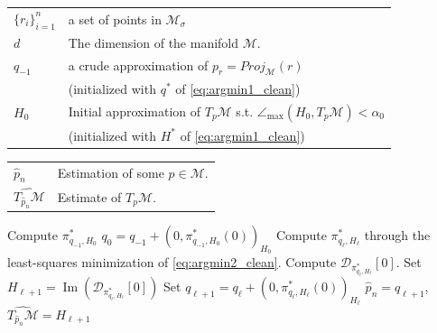 \documentclass[12pt]{article}
\theoremstyle{remark}
\newcommand{\MM}{\mathcal{M}}
\newcommand{\DD}{\mathcal{D}}
\DeclareMathOperator{\Ima}{Im}
\newcommand{\mycomment}[1]{
	\textcolor{red}{Comment: #1}%
}
\begin{document}
\begin{algorithm}[H]
	\caption{Step 2: in practice}
	\label{alg:step2InPractice_clean}
	\begin{algorithmic}[1]
		\begin{tabular}[t]{ll}
            $\{r_i\}_{i=1}^n$& a set of points in $\MM_\sigma$ \\
            $d$ & The dimension of the manifold $\MM$.\\
            $q_{-1}$ & a crude approximation of $p_r = Proj_\MM(r)$ \\ &(initialized with $q^*$ of \eqref{eq:argmin1_clean})\\
			$H_0$ & Initial approximation of $T_{p}\MM$ s.t. $\angle_{\max}(H_0,T_{p}\MM) < \alpha_0$ \\
            &(initialized with $H^*$ of \eqref{eq:argmin1_clean})\\
		\end{tabular}
		\begin{tabular}[t]{ll}
				$\hat p_n$ & Estimation of some $p\in\MM$.\\
				$\widehat{T_{\hat p_n}\MM}$ & Estimate of  $T_p\MM$.\\
		\end{tabular}
		
		\State Compute $\pi^*_{q_{-1}, H_0}$
		\State $q_0 = q_{-1} + (0,\pi^*_{q_{-1}, H_0}(0))_{H_0}$ 
        \Repeat %
        \State Compute $\pi^*_{q_\ell,H_{\ell}}$ through the least-squares minimization of \eqref{eq:argmin2_clean}.
        \State Compute $\DD_{\pi^*_{q_\ell,H_{\ell}}}[0]$.
        \State Set $H_{\ell + 1} = \Ima(\DD_{\pi^*_{q_\ell,H_{\ell}}}[0])$
        \State Set $q_{\ell+1} = q_\ell + (0, \pi^*_{q_\ell,H_{\ell}}(0))_{H_\ell}$
		\State \Return $\hat p_n = q_{\ell+1}$,  $\widehat{T_{\hat p_n}\MM} = H_{\ell+1} $
	\end{algorithmic}
\end{algorithm}
\end{document}
